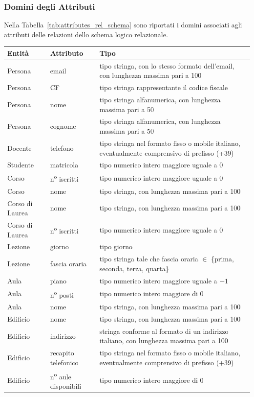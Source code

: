 \documentclass[a4paper,11pt]{article}
\begin{document}
\subsubsection{Domini degli Attributi}

Nella Tabella~\ref{tab:attributes_rel_schema} sono riportati i domini associati agli attributi delle relazioni dello schema logico relazionale.

\begin{table}[H]
\centering
\begin{tabularx}{\textwidth}{l l X}
    \toprule
    \textbf{Entità} & \textbf{Attributo} & \textbf{Tipo} \\
    \midrule
    Persona & email & tipo stringa, con lo stesso formato dell'email, con lunghezza massima pari a 100 \\
    Persona & CF & tipo stringa rappresentante il codice fiscale \\
    Persona & nome & tipo stringa alfanumerica, con lunghezza massima pari a 50 \\
    Persona & cognome & tipo stringa alfanumerica, con lunghezza massima pari a 50 \\
    Docente & telefono & tipo stringa nel formato fisso o mobile italiano, eventualmente comprensivo di prefisso (+39) \\
    Studente & matricola & tipo numerico intero maggiore uguale a $0$ \\
    Corso & n\textsuperscript{o} iscritti & tipo numerico intero maggiore uguale a $0$ \\
    Corso & nome & tipo stringa, con lunghezza massima pari a 100 \\
    Corso di Laurea & nome & tipo stringa, con lunghezza massima pari a 100 \\
    Corso di Laurea & n\textsuperscript{o} iscritti & tipo numerico intero maggiore uguale a $0$ \\
    Lezione & giorno & tipo giorno \\
    Lezione & fascia oraria & tipo stringa tale che fascia oraria $\in$ \{prima, seconda, terza, quarta\} \\
    Aula & piano & tipo numerico intero maggiore uguale a $-1$ \\
    Aula & n\textsuperscript{o} posti & tipo numerico intero maggiore di $0$ \\
    Aula & nome & tipo stringa, con lunghezza massima pari a 100 \\
    Edificio & nome & tipo stringa, con lunghezza massima pari a 100 \\
    Edificio & indirizzo & stringa conforme al formato di un indirizzo italiano, con lunghezza massima pari a 100 \\
    Edificio & recapito telefonico & tipo stringa nel formato fisso o mobile italiano, eventualmente comprensivo di prefisso (+39) \\
    Edificio & n\textsuperscript{o} aule disponibili & tipo numerico intero maggiore di $0$ \\
    

\end{tabularx}
\end{table}
\end{document}
